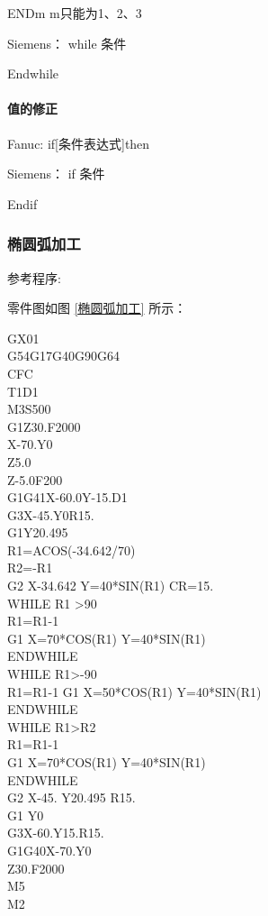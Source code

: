 ENDm    m只能为1、2、3

Siemens： while 条件

Endwhile 

\paragraph{值的修正}

Fanuc:  if[条件表达式]then

Siemens： if  条件

Endif

\subsubsection{椭圆弧加工}
参考程序:

零件图如图 \ref{椭圆弧加工} 所示：



GX01 \\
G54G17G40G90G64\\
CFC\\
T1D1\\
M3S500\\
G1Z30.F2000\\
X-70.Y0\\
Z5.0\\
Z-5.0F200\\
G1G41X-60.0Y-15.D1\\
G3X-45.Y0R15.\\
G1Y20.495\\
R1=ACOS(-34.642/70)\\
R2=-R1\\
G2 X-34.642  Y=40*SIN(R1)  CR=15.\\
WHILE  R1 >90\\
R1=R1-1\\
G1 X=70*COS(R1)  Y=40*SIN(R1)\\
ENDWHILE\\
WHILE  R1>-90\\
R1=R1-1
G1 X=50*COS(R1)  Y=40*SIN(R1)\\
ENDWHILE\\
WHILE  R1>R2\\
R1=R1-1\\
G1 X=70*COS(R1)  Y=40*SIN(R1)\\
ENDWHILE\\
G2 X-45. Y20.495 R15.\\
G1 Y0\\
G3X-60.Y15.R15.\\
G1G40X-70.Y0\\
Z30.F2000\\
M5\\
M2\\

